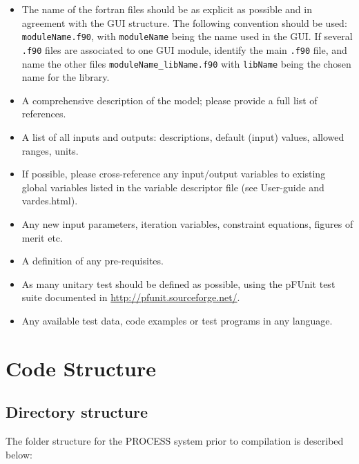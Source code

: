 \documentclass[11pt,a4paper]{report}
\begin{document}
\begin{itemize}
	
\item The name of the fortran files should be as explicit as possible and in agreement with the GUI structure. The following convention should be used: \texttt{moduleName.f90}, with \texttt{moduleName} being the name used in the GUI. If several \texttt{.f90} files are associated to one GUI module, identify the main \texttt{.f90} file, and name the other files \texttt{moduleName\_libName.f90} with \texttt{libName} being the chosen name for the library.

\item A comprehensive description of the model; please provide a full list of
  references.

\item A list of all inputs and outputs: descriptions, default (input) values,
  allowed ranges, units.

\item If possible, please cross-reference any input/output variables to
  existing global variables listed in the variable descriptor file (see User-guide and vardes.html).

\item Any new input parameters, iteration variables, constraint equations, figures of merit etc.

\item A definition of any pre-requisites.

\item  As many unitary test should be defined as possible, using the pFUnit test suite documented in \url{http://pfunit.sourceforge.net/}.

\item Any available test data, code examples or test programs in any language.

\end{itemize}



\section{Code Structure}
\label{sec:code_structure}

\subsection{Directory structure}
\label{sec:dir_structure}

The folder structure for the PROCESS system prior to compilation is described below:
\end{document}
